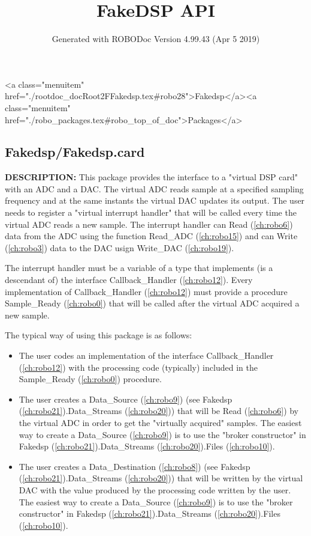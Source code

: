 \documentclass{article}
\title{FakeDSP API}
\author{Generated with ROBODoc Version 4.99.43 (Apr  5 2019)
}
\begin{document}
\maketitle
\printindex
\tableofcontents
\newpage

<a class="menuitem" href="./rootdoc_docRoot2FFakedsp.tex#robo28">Fakedsp</a><a class="menuitem" href="./robo_packages.tex#robo_top_of_doc">Packages</a>\subsection{Fakedsp/Fakedsp.card}
\textbf{DESCRIPTION:}\hspace{0.08in}
  This package provides the interface to a "virtual DSP card" with an ADC
  and a DAC. The virtual ADC reads sample at a specified sampling frequency
  and at the same instants the virtual DAC updates its output. 
  The user needs to register a "virtual interrupt handler"
  that will be called every time the virtual ADC reads a new sample.
  The interrupt handler can Read (\ref{ch:robo6}) data from the ADC using the function
  Read\_ADC (\ref{ch:robo15}) and can Write (\ref{ch:robo3}) data to the DAC usign Write\_DAC (\ref{ch:robo19}).

  

  The interrupt handler must be a variable of a type that implements 
  (is a descendant of) the interface Callback\_Handler (\ref{ch:robo12}).  Every
  implementation of Callback\_Handler (\ref{ch:robo12}) must provide a procedure Sample\_Ready (\ref{ch:robo0})
  that will be called after the virtual ADC acquired a new sample.



  The typical way of using this package is as follows:

\begin{itemize}
  \item   The user codes an implementation of the interface Callback\_Handler (\ref{ch:robo12})
    with the processing code (typically) included in the Sample\_Ready (\ref{ch:robo0}) 
    procedure. 
  \item   The user creates a Data\_Source (\ref{ch:robo9}) (see Fakedsp (\ref{ch:robo21}).Data\_Streams (\ref{ch:robo20})) that will 
    be Read (\ref{ch:robo6}) by the virtual ADC in order to get the "virtually 
    acquired" samples.  The easiest way to create a Data\_Source (\ref{ch:robo9}) is to 
    use the "broker constructor" in Fakedsp (\ref{ch:robo21}).Data\_Streams (\ref{ch:robo20}).Files (\ref{ch:robo10}).
  \item   The user creates a Data\_Destination (\ref{ch:robo8}) (see Fakedsp (\ref{ch:robo21}).Data\_Streams (\ref{ch:robo20})) that will 
    be written by the virtual DAC with the value produced by the processing
    code written by the user.  
    The easiest way to create a Data\_Source (\ref{ch:robo9}) is to 
    use the "broker constructor" in Fakedsp (\ref{ch:robo21}).Data\_Streams (\ref{ch:robo20}).Files (\ref{ch:robo10}).
\end{itemize}
\end{document}
